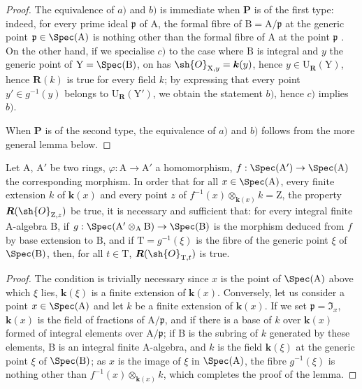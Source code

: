 \begin{proof}
The equivalence of $a)$ and $b)$ is immediate when $\boldsymbol{P}$ is of the first type: indeed, for every prime ideal $\mathfrak{p}$ of $\mathrm{A}$, the formal fibre of $\mathrm{B}=\mathrm{A}/\mathfrak{p}$ at the generic point $\mathfrak{p}\in\Spec(\mathrm{A})$ is nothing other than the formal fibre of $\mathrm{A}$ at the point $\mathfrak{p}$ .
On the other hand, if we specialise $c)$ to the case where $\mathrm{B}$ is integral and $y$ the generic point of $\mathrm{Y}=\Spec(\mathrm{B})$, on has $\sh{O}_{\mathrm{X},y}=\boldsymbol{k}(y)$, hence $y\in\mathrm{U}_{\boldsymbol{R}}(\mathrm{Y})$, hence $\boldsymbol{R}(k)$ is true for every field $k$; by expressing that every point $y'\in g^{-1}(y)$ belongs to $\mathrm{U}_{\boldsymbol{R}}(\mathrm{Y}')$, we obtain the statement $b)$, hence $c)$ implies $b)$.

When $\boldsymbol{P}$ is of the second type, the equivalence of $a)$ and $b)$ follows from the more general lemma below.
\end{proof}

\begin{lemma}[7.3.16.2]
\label{IV.7.3.16.2}
Let $\mathrm{A}$, $\mathrm{A}'$ be two rings, $\varphi:\mathrm{A}\to\mathrm{A}'$ a homomorphism, $f:\Spec(\mathrm{A}')\to\Spec(\mathrm{A})$ the corresponding morphism.
In order that for all $x\in\Spec(\mathrm{A})$, every finite extension $k$ of $\boldsymbol{k}(x)$ and every point $z$ of $f^{-1}(x)\otimes_{\boldsymbol{k}(x)} k=\mathrm{Z}$, the property $\boldsymbol{R}(\sh{O}_{\mathrm{Z},z})$ be true, it is necessary and sufficient that: for every integral finite A-algebra $\mathrm{B}$, if $g:\Spec(\mathrm{A}'\otimes_\mathrm{A}\mathrm{B})\to\Spec(\mathrm{B})$ is the morphism deduced from $f$ by base extension to $\mathrm{B}$, and if $\mathrm{T}=g^{-1}(\xi)$ is the fibre of the generic point $\xi$ of $\Spec(\mathrm{B})$, then, for all $t\in\mathrm{T}$, $\boldsymbol{R}(\sh{O}_{\mathrm{T},t})$ is true.
\end{lemma}

\begin{proof}
The condition is trivially necessary since $x$ is the point of $\Spec(\mathrm{A})$ above which $\xi$ lies, $\boldsymbol{k}(\xi)$ is a finite extension of $\boldsymbol{k}(x)$.
Conversely, let us consider a point $x\in\Spec(\mathrm{A})$ and let $k$ be a finite extension of $\boldsymbol{k}(x)$.
If we set $\mathfrak{p}=\mathfrak{I}_x$, $\boldsymbol{k}(x)$ is the field of fractions of $\mathrm{A}/\mathfrak{p}$, and if there is a base of $k$ over $\boldsymbol{k}(x)$ formed of integral elements over $\mathrm{A}/\mathfrak{p}$; if $\mathrm{B}$ is the subring of $k$ generated by these elements, $\mathrm{B}$ is an integral finite A-algebra, and $k$ is the field $\boldsymbol{k}(\xi)$ at the generic point $\xi$ of $\Spec(\mathrm{B})$; as $x$ is the image of $\xi$ in $\Spec(\mathrm{A})$, the fibre $g^{-1}(\xi)$ is nothing other than $f^{-1}(x)\otimes_{\boldsymbol{k}(x)}k$, which completes the proof of the lemma.
\end{proof}


